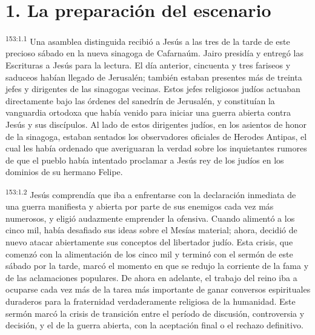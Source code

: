\section*{1. La preparación del escenario}
\par 
\textsuperscript{153:1.1} Una asamblea distinguida recibió a Jesús a las tres de la tarde de este precioso sábado en la nueva sinagoga de Cafarnaúm. Jairo presidía y entregó las Escrituras a Jesús para la lectura. El día anterior, cincuenta y tres fariseos y saduceos habían llegado de Jerusalén; también estaban presentes más de treinta jefes y dirigentes de las sinagogas vecinas. Estos jefes religiosos judíos actuaban directamente bajo las órdenes del sanedrín de Jerusalén, y constituían la vanguardia ortodoxa que había venido para iniciar una guerra abierta contra Jesús y sus discípulos. Al lado de estos dirigentes judíos, en los asientos de honor de la sinagoga, estaban sentados los observadores oficiales de Herodes Antipas, el cual les había ordenado que averiguaran la verdad sobre los inquietantes rumores de que el pueblo había intentado proclamar a Jesús rey de los judíos en los dominios de su hermano Felipe.

\par 
\textsuperscript{153:1.2} Jesús comprendía que iba a enfrentarse con la declaración inmediata de una guerra manifiesta y abierta por parte de sus enemigos cada vez más numerosos, y eligió audazmente emprender la ofensiva. Cuando alimentó a los cinco mil, había desafiado sus ideas sobre el Mesías material; ahora, decidió de nuevo atacar abiertamente sus conceptos del libertador judío. Esta crisis, que comenzó con la alimentación de los cinco mil y terminó con el sermón de este sábado por la tarde, marcó el momento en que se redujo la corriente de la fama y de las aclamaciones populares. De ahora en adelante, el trabajo del reino iba a ocuparse cada vez más de la tarea más importante de ganar conversos espirituales duraderos para la fraternidad verdaderamente religiosa de la humanidad. Este sermón marcó la crisis de transición entre el período de discusión, controversia y decisión, y el de la guerra abierta, con la aceptación final o el rechazo definitivo.

